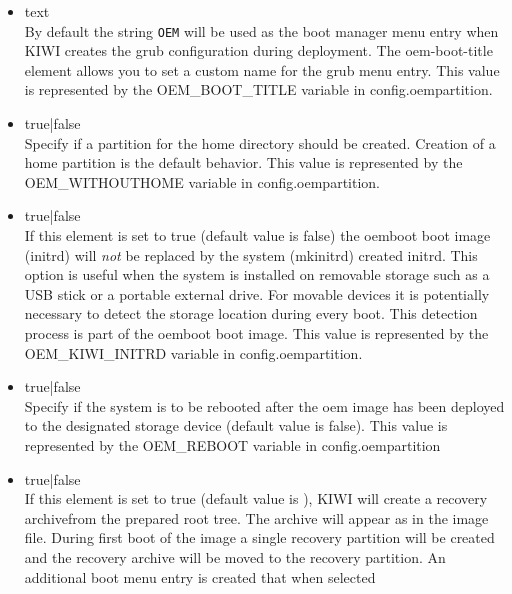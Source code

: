 \begin{itemize}
	\begin{itemize}
    \item {}text\\
       By default the string \verb!OEM! will be used as the boot manager 
       menu entry when KIWI creates the grub configuration during
       deployment. The oem-boot-title element allows you to set a custom
       name for the grub menu entry. This value is represented by the
       OEM\_BOOT\_TITLE variable in config.oempartition.
	\item {}true|false\\
       Specify if a partition for the home directory should be created.
       Creation of a home partition is the default behavior. This value is 
       represented by the OEM\_WITHOUTHOME variable in config.oempartition.
	\item {}true|false\\
       If this element is set to true (default value is false) the oemboot 
       boot image (initrd) will \emph{not} be replaced by the system 
       (mkinitrd) created initrd. This option is useful when the system
       is installed on removable storage such as a USB stick or a portable
       external drive. For movable devices it is potentially necessary to 
       detect the storage location during every boot. This detection
       process is part of the oemboot boot image. This value is represented
       by the OEM\_KIWI\_INITRD variable in config.oempartition.
	\item {}true|false\\
       Specify if the system is to be rebooted after the oem image has been
       deployed to the designated storage device (default value is false). 
       This value is represented by the OEM\_REBOOT variable in 
       config.oempartition
	\item {}true|false\\
      If this element is set to true (default value is ), KIWI will
      create a recovery archivefrom the prepared root tree. The archive will 
      appear as  in the image file. During 
      first boot of the image a single recovery partition will be
      created and the recovery archive will be moved to the recovery 
      partition. An additional boot menu entry is created that when selected

\end{itemize}
\end{itemize}

